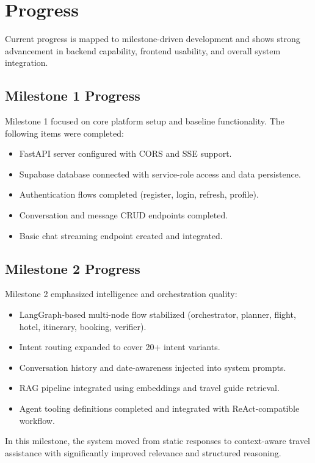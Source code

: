 \documentclass[12pt]{article}
\begin{document}
\section{Progress}
Current progress is mapped to milestone-driven development and shows strong advancement in backend capability, frontend usability, and overall system integration.

\subsection{Milestone 1 Progress}
Milestone 1 focused on core platform setup and baseline functionality. The following items were completed:
\begin{itemize}
    \item FastAPI server configured with CORS and SSE support.
    \item Supabase database connected with service-role access and data persistence.
    \item Authentication flows completed (register, login, refresh, profile).
    \item Conversation and message CRUD endpoints completed.
    \item Basic chat streaming endpoint created and integrated.
\end{itemize}

\subsection{Milestone 2 Progress}
Milestone 2 emphasized intelligence and orchestration quality:
\begin{itemize}
    \item LangGraph-based multi-node flow stabilized (orchestrator, planner, flight, hotel, itinerary, booking, verifier).
    \item Intent routing expanded to cover 20+ intent variants.
    \item Conversation history and date-awareness injected into system prompts.
    \item RAG pipeline integrated using embeddings and travel guide retrieval.
    \item Agent tooling definitions completed and integrated with ReAct-compatible workflow.
\end{itemize}

In this milestone, the system moved from static responses to context-aware travel assistance with significantly improved relevance and structured reasoning.
\end{document}

